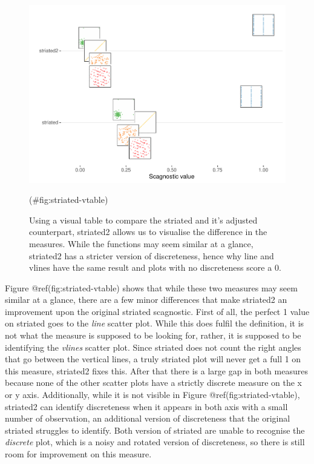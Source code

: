 \begin{Schunk}
\begin{figure}
\includegraphics[width=1\linewidth]{mason-lee-laa-cook_files/figure-latex/striated-vtable-1} \caption[Using a visual table to compare the striated and it's adjusted counterpart, striated2 allows us to visualise the difference in the measures]{Using a visual table to compare the striated and it's adjusted counterpart, striated2 allows us to visualise the difference in the measures. While the functions may seem similar at a glance, striated2 has a stricter version of discreteness, hence why line and vlines have the same result and plots with no discreteness score a 0.}(\#fig:striated-vtable)
\end{figure}
\end{Schunk}

Figure @ref(fig:striated-vtable) shows that while these two measures may
seem similar at a glance, there are a few minor differences that make
striated2 an improvement upon the original striated scagnostic. First of
all, the perfect 1 value on striated goes to the \emph{line} scatter
plot. While this does fulfil the definition, it is not what the measure
is supposed to be looking for, rather, it is supposed to be identifying
the \emph{vlines} scatter plot. Since striated does not count the right
angles that go between the vertical lines, a truly striated plot will
never get a full 1 on this measure, striated2 fixes this. After that
there is a large gap in both measures because none of the other scatter
plots have a strictly discrete measure on the x or y axis. Additionally,
while it is not visible in Figure @ref(fig:striated-vtable), striated2
can identify discreteness when it appears in both axis with a small
number of observation, an additional version of discreteness that the
original striated struggles to identify. Both version of striated are
unable to recognise the \emph{discrete} plot, which is a noisy and
rotated version of discreteness, so there is still room for improvement
on this measure.

